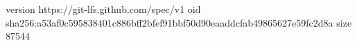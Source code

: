 version https://git-lfs.github.com/spec/v1
oid sha256:a53af0c595838401c886bff2bfef91bbf50d90eaaddcfab49865627e59fc2d8a
size 87544
